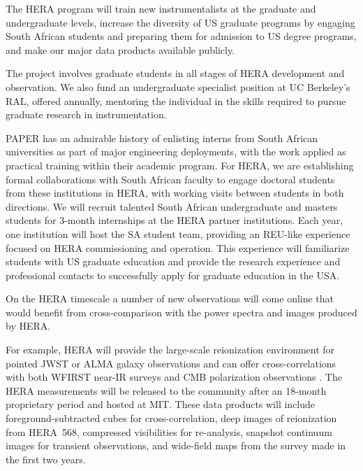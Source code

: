 \documentclass[preprint]{aastex}
\begin{document}
The HERA program will train new
instrumentalists at the graduate and undergraduate levels, increase the
diversity of US graduate programs by engaging South African students and
preparing them for admission to US degree programs, and make our major data
products available publicly.

The project involves graduate students in all
stages of HERA development and observation. We also fund an
undergraduate specialist position
at UC Berkeley's RAL, offered annually, 
mentoring the individual in the skills required to pursue graduate
research in instrumentation.

PAPER has
an admirable history of enlisting interns from South African
universities as part of major engineering deployments, with the work
applied as practical training within their academic program.
For HERA, we are establishing formal collaborations with South African
faculty to engage doctoral students from these institutions in HERA,
with working visits between students in both directions. We will
recruit talented South African undergraduate and masters students for
3-month internships at the HERA partner institutions. Each year, one
institution will host the SA student team, providing an REU-like
experience focused on HERA 
commissioning and operation. This
experience will familiarize students with US graduate education
and provide the research experience and professional contacts to
successfully apply for graduate education in the USA.

%
%

\vspace{5 pt}
On the HERA timescale a number of new observations will come online that would
benefit from cross-comparison with the power spectra and images produced by
HERA. 

For example, HERA will provide the large-scale reionization environment for pointed JWST or ALMA 
galaxy observations and can offer cross-correlations with both WFIRST near-IR surveys \citep{lidz_et_al2009} 
and CMB polarization observations \citep{tashiro_et_al2010}.
The HERA measurements
will be released to the community after an 18-month proprietary period and
hosted at MIT. These data products will include foreground-subtracted cubes for
cross-correlation, deep images of reionization from HERA~568, compressed
visibilities for re-analysis, snapshot continuum images for transient
observations, and wide-field maps from the survey made in the first two years.
\end{document}
